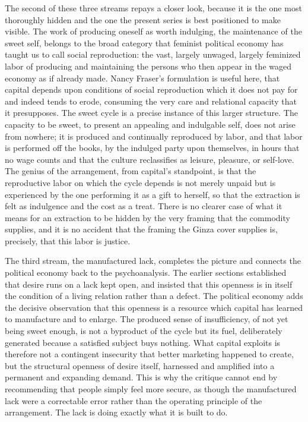 The second of these three streams repays a closer look, because it is the one most thoroughly hidden and the one the present series is best positioned to make visible. The work of producing oneself as worth indulging, the maintenance of the sweet self, belongs to the broad category that feminist political economy has taught us to call social reproduction: the vast, largely unwaged, largely feminized labor of producing and maintaining the persons who then appear in the waged economy as if already made. Nancy Fraser's formulation is useful here, that capital depends upon conditions of social reproduction which it does not pay for and indeed tends to erode, consuming the very care and relational capacity that it presupposes. The sweet cycle is a precise instance of this larger structure. The capacity to be sweet, to present an appealing and indulgable self, does not arise from nowhere; it is produced and continually reproduced by labor, and that labor is performed off the books, by the indulged party upon themselves, in hours that no wage counts and that the culture reclassifies as leisure, pleasure, or self-love. The genius of the arrangement, from capital's standpoint, is that the reproductive labor on which the cycle depends is not merely unpaid but is experienced by the one performing it as a gift to herself, so that the extraction is felt as indulgence and the cost as a treat. There is no clearer case of what it means for an extraction to be hidden by the very framing that the commodity supplies, and it is no accident that the framing the Ginza cover supplies is, precisely, that this labor is justice.

The third stream, the manufactured lack, completes the picture and connects the political economy back to the psychoanalysis. The earlier sections established that desire runs on a lack kept open, and insisted that this openness is in itself the condition of a living relation rather than a defect. The political economy adds the decisive observation that this openness is a resource which capital has learned to manufacture and to enlarge. The produced sense of insufficiency, of not yet being sweet enough, is not a byproduct of the cycle but its fuel, deliberately generated because a satisfied subject buys nothing. What capital exploits is therefore not a contingent insecurity that better marketing happened to create, but the structural openness of desire itself, harnessed and amplified into a permanent and expanding demand. This is why the critique cannot end by recommending that people simply feel more secure, as though the manufactured lack were a correctable error rather than the operating principle of the arrangement. The lack is doing exactly what it is built to do.

